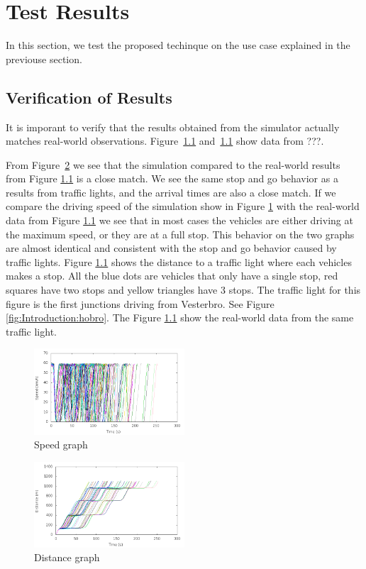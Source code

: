 \section{Test Results}
In this section, we test the proposed techinque on the use case explained in the previouse section.

\subsection{Verification of Results}
It is imporant to verify that the results obtained from the simulator actually matches real-world observations.
Figure~\ref{} and~\ref{} show data from ???.

From Figure~\ref{fig:TestResults:distance0} we see that the simulation compared to the real-world results from Figure \ref{} is a close match. 
We see the same stop and go behavior as a results from traffic lights, and the arrival times are also a close match. 
If we compare the driving speed of the simulation show in Figure \ref{fig:TestResults:speed0} with the real-world data from Figure \ref{} we see that in most cases the vehicles are either driving at the maximum speed, or they are at a full stop. 
This behavior on the two graphs are almost identical and consistent with the stop and go behavior caused by traffic lights. 
Figure \ref{} shows the distance to a traffic light where each vehicles makes a stop. 
All the blue dots are vehicles that only have a single stop, red squares have two stops and yellow triangles have 3 stops.
The traffic light for this figure is the first junctions driving from Vesterbro. See Figure \ref{fig:Introduction:hobro}. The Figure \ref{} show the real-world data from the same traffic light. 

\begin{figure}[htb]
\includegraphics[width=0.5\textwidth]{images/tp0/speedUncontrolled0.png}
\caption{Speed graph}
\label{fig:TestResults:speed0}
\end{figure}

\begin{figure}[htb]
\includegraphics[width=0.5\textwidth]{images/tp0/distanceUncontrolled0.png}
\caption{Distance graph}
\label{fig:TestResults:distance0}
\end{figure}


